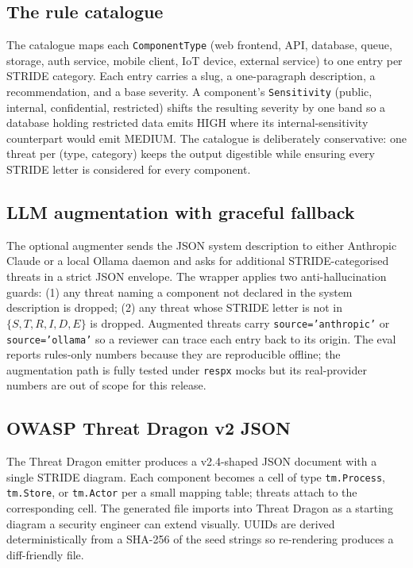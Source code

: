 \documentclass[conference]{IEEEtran}
\begin{document}
\subsection{The rule catalogue}
The catalogue maps each \texttt{ComponentType} (web frontend, API,
database, queue, storage, auth service, mobile client, IoT device,
external service) to one entry per STRIDE category. Each entry
carries a slug, a one-paragraph description, a recommendation, and a
base severity. A component's \texttt{Sensitivity} (public,
internal, confidential, restricted) shifts the resulting severity by
one band so a database holding restricted data emits HIGH where its
internal-sensitivity counterpart would emit MEDIUM. The catalogue is
deliberately conservative: one threat per (type, category) keeps the
output digestible while ensuring every STRIDE letter is considered
for every component.

\subsection{LLM augmentation with graceful fallback}
The optional augmenter sends the JSON system description to either
Anthropic Claude or a local Ollama daemon and asks for additional
STRIDE-categorised threats in a strict JSON envelope. The wrapper
applies two anti-hallucination guards: (1) any threat naming a
component not declared in the system description is dropped; (2) any
threat whose STRIDE letter is not in $\{S,T,R,I,D,E\}$ is dropped.
Augmented threats carry \texttt{source='anthropic'} or
\texttt{source='ollama'} so a reviewer can trace each entry back to
its origin. The eval reports rules-only numbers because they are
reproducible offline; the augmentation path is fully tested under
\texttt{respx} mocks but its real-provider numbers are out of scope
for this release.

\subsection{OWASP Threat Dragon v2 JSON}
The Threat Dragon emitter produces a v2.4-shaped JSON document with
a single STRIDE diagram. Each component becomes a cell of type
\texttt{tm.Process}, \texttt{tm.Store}, or \texttt{tm.Actor} per a
small mapping table; threats attach to the corresponding cell. The
generated file imports into Threat Dragon as a starting diagram a
security engineer can extend visually. UUIDs are derived
deterministically from a SHA-256 of the seed strings so
re-rendering produces a diff-friendly file.
\end{document}
